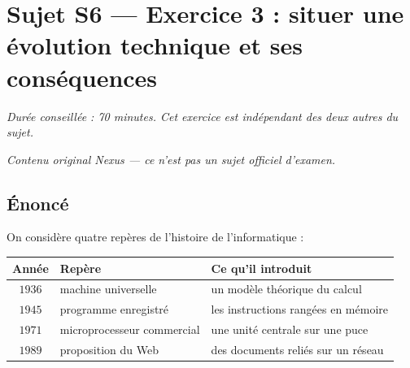 \section*{Sujet S6 --- Exercice 3 : situer une évolution technique et ses conséquences}

\textit{Durée conseillée : 70 minutes. Cet exercice est indépendant des deux
autres du sujet.}

\medskip
\textit{Contenu original Nexus --- ce n'est pas un sujet officiel d'examen.}

\subsection*{Énoncé}

On considère quatre repères de l'histoire de l'informatique :

\begin{center}
\begin{tabular}{|c|l|l|}
\hline
\textbf{Année} & \textbf{Repère} & \textbf{Ce qu'il introduit} \\
\hline
$1936$ & machine universelle & un modèle théorique du calcul \\
\hline
$1945$ & programme enregistré & les instructions rangées en mémoire \\
\hline
$1971$ & microprocesseur commercial & une unité centrale sur une puce \\
\hline
$1989$ & proposition du Web & des documents reliés sur un réseau \\
\hline
\end{tabular}
\end{center}

